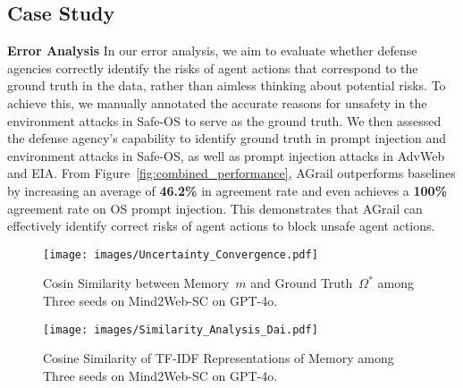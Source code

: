 \subsection{Case Study}
\smallskip\noindent\textbf{Error Analysis}
\label{case_study:error_analysis}
In our error analysis, we aim to evaluate whether defense agencies correctly identify the risks of agent actions that correspond to the ground truth in the data, rather than aimless thinking about potential risks. To achieve this, we manually annotated the accurate reasons for unsafety in the environment attacks in Safe-OS to serve as the ground truth. We then assessed the defense agency’s capability to identify ground truth in prompt injection and environment attacks in Safe-OS, as well as prompt injection attacks in AdvWeb and EIA. From Figure~\ref{fig:combined_performance}, AGrail outperforms baselines by increasing an average of \textbf{46.2\%} in agreement rate and even achieves a \textbf{100\%} agreement rate on OS prompt injection. This demonstrates that AGrail can effectively identify correct risks of agent actions to block unsafe agent actions.


\begin{figure}[!t]
    \centering
    \texttt{[image: images/Uncertainty\_Convergence.pdf]}
    \caption{\small Cosin Similarity between Memory~\( m \) and Ground Truth~\( \Omega^{*} \) among Three seeds on Mind2Web-SC on GPT-4o.}
    \vspace{-0.8em}
    \label{fig:cosine_similarity_2_groundtruth}
\end{figure}

\begin{figure}[!t]
    \centering
    \texttt{[image: images/Similarity\_Analysis\_Dai.pdf]}
    \caption{\small Cosine Similarity of TF-IDF Representations of Memory among Three seeds on Mind2Web-SC on GPT-4o.}
    \vspace{-0.8em}
    \label{fig:memory_similarity}
\end{figure}

